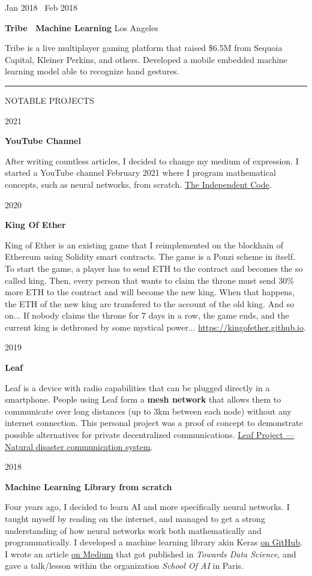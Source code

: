 \documentclass[11pt, a4paper]{article}
\newcommand{\drawline}{\leavevmode\leaders\hrule height 1pt\hfill\kern 0pt}
\newcommand{\link}[2]{\underline{\textcolor{black}{\href{#1}{#2}}}}
\newcommand{\newsection}[1]{
    \drawline
    \break
    \onehalfspacing
    \begin{minipage}[t]{120pt}
        \addfontfeature{LetterSpace=15}
        \footnotesize{\MakeUppercase{#1}}
        \addfontfeature{LetterSpace=0}
    \end{minipage}
}
\newcommand{\internship}[6]{
    \begin{minipage}[t]{120pt}
        \footnotesize{#1 \textemdash\ #2}
    \end{minipage}
    \begin{minipage}[t]{\linegoal}
        \textbf{\normalsize{#3 \textemdash\ #4}}
        \hfill
        \footnotesize{#5}
        \vspace{0.5em}
        \begin{flushleft}
            \footnotesize{#6}
        \end{flushleft}
    \end{minipage}
}
\newcommand{\project}[3]{
    \begin{minipage}[t]{120pt}
        \footnotesize{#1}
    \end{minipage}
    \begin{minipage}[t]{\linegoal}
        \textbf{\normalsize{#2}}
        \vspace{0.5em}
        \begin{flushleft}
            \footnotesize{#3}
        \end{flushleft}
    \end{minipage}
}
\begin{document}
    \break
    \internship{Jan 2018}{Feb 2018}{Tribe}{Machine Learning}{Los Angeles}{
        Tribe is a live multiplayer gaming platform that raised \$6.5M from Sequoia Capital, Kleiner Perkins, and others. Developed a mobile embedded machine learning model able to recognize hand gestures.
    }

    \newsection{Notable Projects}
    \break
    \project{2021}{YouTube Channel}{
        After writing countless articles, I decided to change my medium of expression. I started a YouTube channel February 2021 where I program mathematical concepts, such as neural networks, from scratch. \link{https://www.youtube.com/channel/UC1OLIHvAKBQy3o5LcbbxUSg}{The Independent Code}.
    }
    \break
    \project{2020}{King Of Ether}{
        King of Ether is an existing game that I reimplemented on the blockhain of Ethereum using Solidity smart contracts. The game is a Ponzi scheme in itself. To start the game, a player has to send ETH to the contract and becomes the so called king. Then, every person that wants to claim the throne must send 30\% more ETH to the contract and will become the new king. When that happens, the ETH of the new king are transfered to the account of the old king. And so on... If nobody claims the throne for 7 days in a row, the game ends, and the current king is dethroned by some mystical power... \link{https://kingofether.github.io}{https://kingofether.github.io}.
    }
    \break
    \project{2019}{Leaf}{
        Leaf is a device with radio capabilities that can be plugged directly in a smartphone. People using Leaf form a \textbf{mesh network} that allows them to communicate over long distances (up to 3km between each node) without any internet connection. This personal project was a proof of concept to demonstrate possible alternatives for private decentralized communications. \link{https://medium.com/@martin.marvin/leaf-project-natural-disaster-communication-system-1d73e8eaa7b8}{Leaf Project — Natural disaster communication system}.
    }
    \break
    \project{2018}{Machine Learning Library from scratch}{
        Four years ago, I decided to learn AI and more specifically neural networks. I taught myself by reading on the internet, and managed to get a strong understanding of how neural networks work both mathematically and programmatically. I developed a machine learning library akin Keras \link{https://github.com/omaraflak/my-neural-nets}{on GitHub}. I wrote an article \link{https://towardsdatascience.com/math-neural-network-from-scratch-in-python-d6da9f29ce65?source=friends_link&sk=2776d172d7666cc74c6b0ed292a91b0b}{on Medium} that got published in \textit{Towards Data Science}, and gave a talk/lesson within the organization \textit{School Of AI} in Paris.
    }
\end{document}
